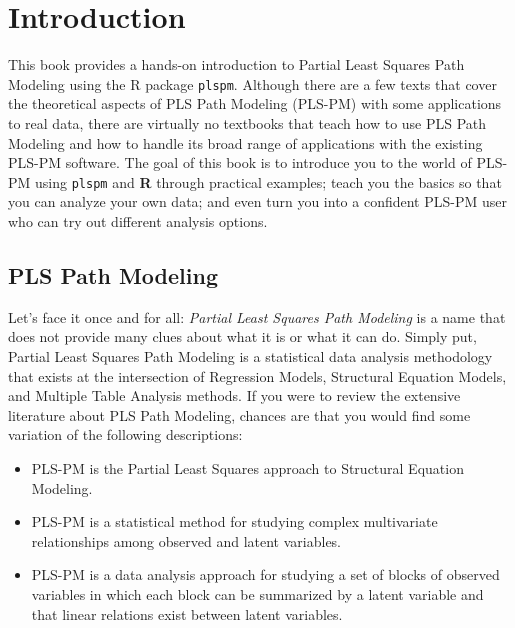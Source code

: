 \documentclass[12pt]{book}\usepackage{graphicx, color}
\newcommand{\plspm}{\texttt{plspm}}
\begin{document}

\newpage
\thispagestyle{empty}
\mbox{}





\chapter{Introduction}
This book provides a hands-on introduction to Partial Least Squares Path Modeling using the R package \plspm{}. Although there are a few texts that cover the theoretical aspects of PLS Path Modeling (PLS-PM) with some applications to real data, there are virtually no textbooks that teach how to use PLS Path Modeling and how to handle its broad range of applications with the existing PLS-PM software. The goal of this book is to introduce you to the world of PLS-PM using \plspm{} and \textbf{R} through practical examples; teach you the basics so that you can analyze your own data; and even turn you into a confident PLS-PM user who can try out different analysis options.


\section{PLS Path Modeling}
Let's face it once and for all: \textit{Partial Least Squares Path Modeling} is a name that does not provide many clues about what it is or what it can do. Simply put, Partial Least Squares Path Modeling is a statistical data analysis methodology that exists at the intersection of Regression Models, Structural Equation Models, and Multiple Table Analysis methods. If you were to review the extensive literature about PLS Path Modeling, chances are that you would find some variation of the following descriptions:

\begin{itemize}
 \item PLS-PM is the Partial Least Squares approach to Structural Equation Modeling.
 \item PLS-PM is a statistical method for studying complex multivariate relationships among observed and latent variables.
 \item PLS-PM is a data analysis approach for studying a set of blocks of observed variables in which each block can be summarized by a latent variable and that linear relations exist between latent variables.
\end{itemize}
\end{document}
